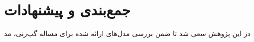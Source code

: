 \chapter{جمع‌بندی و پیشنهادات}\label{Chap6}

دز این پژوهش سعی شد تا ضمن بررسی مدل‌های ارائه شده برای مساله گپ‌زنی، مد